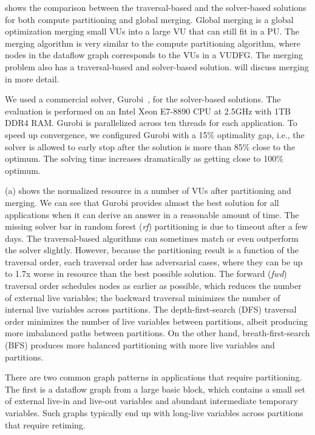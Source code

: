  shows the comparison between the traversal-based and the solver-based solutions for both
compute partitioning and global merging.
Global merging is a global optimization merging small VUs into a large VU that can still fit in
a PU. 
The merging algorithm is very similar to the compute partitioning algorithm, where nodes in the
dataflow graph corresponds to the VUs in a VUDFG. 
The merging problem also has a traversal-based and solver-based solution.
 will discuss merging in more detail.

We used a commercial solver, Gurobi~\cite{gurobi}, for the solver-based solutions. 
The evaluation is performed on an Intel Xeon E7-8890 CPU at 2.5GHz with 1TB DDR4 RAM. 
Gurobi is parallelized across ten threads for each application.
To speed up convergence, we configured Gurobi with a 15\% optimality gap, i.e., the solver is allowed to early stop after the solution is more than 85\% close to the optimum. 
The solving time increases dramatically as getting close to 100\% optimum.

 (a) shows the normalized resource in a number of VUs after partitioning and merging.
We can see that Gurobi provides almost the best solution for all applications when it can derive
an answer in a reasonable amount of time. The missing solver bar in random forest (\emph{rf}) partitioning
is due to timeout after a few days.
The traversal-based algorithms can sometimes match or even outperform the solver slightly.
However, because the partitioning result is a function of the traversal order, 
each traversal order has adversarial cases, where they can be up to 1.7x worse in resource than the best possible solution.
The forward (\emph{fwd}) traversal order schedules nodes as earlier as possible, which reduces the number of
external live variables; the backward traversal minimizes the number of internal live variables
across partitions.
The depth-first-search (DFS) traversal order minimizes the number of live variables between partitions, 
albeit producing more imbalanced paths between partitions. 
On the other hand, breath-first-search (BFS) produces more balanced partitioning with more live variables and partitions.

There are two common graph patterns in applications that require partitioning. 
The first is a dataflow graph from a large basic block, which contains a small set of external
live-in and live-out variables and abundant intermediate temporary variables.
Such graphs typically end up with long-live variables across partitions that require retiming.

